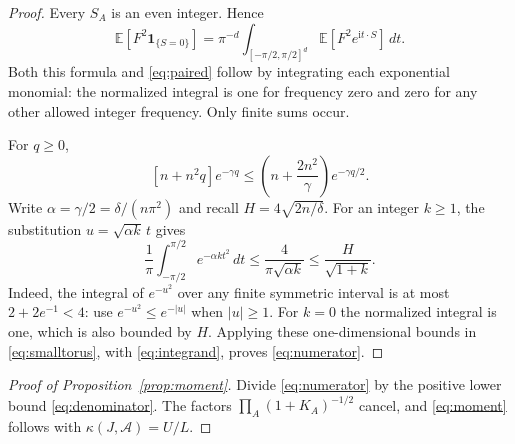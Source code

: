 \documentclass[11pt]{article}
\begin{document}
\begin{proof}
Every $S_A$ is an even integer. Hence
\begin{equation}\label{eq:smalltorus}
 \mathbb E[F^2\mathbf1_{\{S=0\}}]
 =\pi^{-d}\int_{[-\pi/2,\pi/2]^d}
                    \mathbb E[F^2e^{\mathrm i t\cdot S}]\,dt.
\end{equation}
Both this formula and \eqref{eq:paired} follow by integrating each
exponential monomial: the normalized integral is one for frequency zero
and zero for any other allowed integer frequency. Only finite sums occur.

For $q\geq0$,
\[
 [n+n^2q]e^{-\gamma q}
 \leq\left(n+\frac{2n^2}{\gamma}\right)e^{-\gamma q/2}.
\]
Write $\alpha=\gamma/2=\delta/(n\pi^2)$ and recall
$H=4\sqrt{2n/\delta}$. For an integer $k\geq1$, the substitution $u=\sqrt{\alpha k}\,t$ gives
\[
 \frac1\pi\int_{-\pi/2}^{\pi/2}e^{-\alpha k t^2}\,dt
 \leq\frac4{\pi\sqrt{\alpha k}}
 \leq\frac{H}{\sqrt{1+k}}.
\]
Indeed, the integral of $e^{-u^2}$ over any finite symmetric interval is
at most $2+2e^{-1}<4$: use $e^{-u^2}\leq e^{-|u|}$ when $|u|\geq1$.
For $k=0$ the normalized integral is one, which is also bounded by $H$.
Applying these one-dimensional bounds in \eqref{eq:smalltorus}, with
\eqref{eq:integrand}, proves \eqref{eq:numerator}.
\end{proof}

\begin{proof}[Proof of Proposition~\ref{prop:moment}]
Divide \eqref{eq:numerator} by the positive lower bound
\eqref{eq:denominator}. The factors
$\prod_A(1+K_A)^{-1/2}$ cancel, and \eqref{eq:moment} follows with
$\kappa(J,\mathcal A)=U/L$.
\end{proof}
\end{document}
